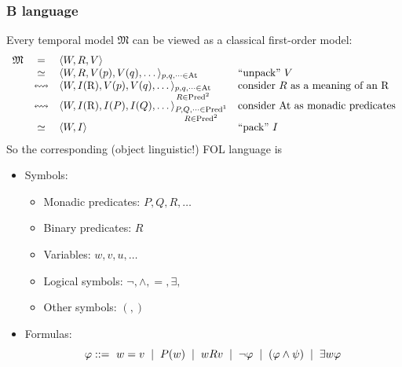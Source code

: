 \documentclass[xcolor=x11names]{beamer}
\newcommand{\vonal} [1][.2]{\hspace{#1cm} | \hspace{#1cm}}
\begin{document}


\begin{frame}
	\frametitle{B language}
Every temporal model $\mathfrak M$ can be viewed as a classical first-order model:
\[ \begin{array}{rcll}
 \mathfrak M &=& \langle W, R, V\rangle &
 \\ &\simeq &\langle W, R, V(p), V(q), \dots \rangle_{p,q,\dots \in \mathrm{At}}  &\textup{``unpack'' $V$}
\\  & \leftrightsquigarrow &\langle W, I(\mathrm R), V(p), V(q), \dots \rangle_{\substack {p,q,\dots \in \mathrm{At} \\ R \in \mathrm{Pred^2} }}  &\textup{consider $R$ as a meaning of an R}
\\  & \leftrightsquigarrow &\langle W, I(\mathrm R), I(P), I(Q), \dots \rangle_{\substack {P,Q,\dots \in \mathrm{Pred^1} \\ R\in \mathrm{Pred^2} }}  &\textup{consider At as monadic predicates}
\\  & \simeq &\langle W, I \rangle  &\textup{``pack'' $I$}
 \end{array}\]
So the corresponding (object linguistic!) FOL language is
\begin{itemize}\footnotesize
\item Symbols:
 \begin{itemize}\footnotesize
 \item Monadic predicates: $P, Q, R, \dots$
 \item Binary predicates: $R$
 \item Variables: $w, v, u, \dots$
 \item Logical symbols: $\lnot, \land, =, \exists,$
 \item Other symbols: $(, )$
 \end{itemize}
\item Formulas:
\[\varphi ::=\, \,  w=v  \vonal P(w)  \vonal wRv  \vonal \lnot \varphi \vonal (\varphi \land \psi) \vonal  \exists w \varphi \]
\end{itemize}

\end{frame}
\end{document}

